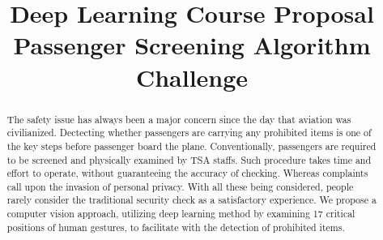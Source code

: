 \documentclass[conference,compsoc]{IEEEtran}
\begin{document}
\title{
	Deep Learning Course Proposal \\
	Passenger Screening Algorithm Challenge \\
}


\author{
\and
}

\maketitle

\begin{abstract}
	The safety issue has always been a major concern since the day that aviation was civilianized. Dectecting whether passengers are carrying any prohibited items is one of the key steps before passenger board the plane. Conventionally, passengers are required to be screened and physically examined by TSA staffs. Such procedure takes time and effort to operate, without guaranteeing the accuracy of checking. Whereas complaints call upon the invasion of personal privacy. With all these being considered, people rarely consider the traditional security check as a satisfactory experience. We propose a computer vision approach, utilizing deep learning method by examining 17 critical positions of human gestures, to facilitate with the detection of prohibited items.
\end{abstract}
\end{document}
